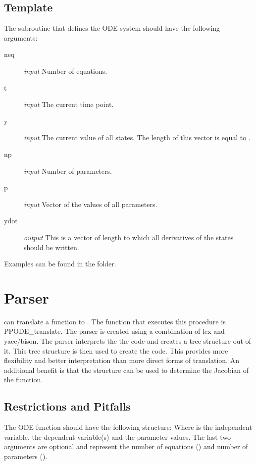 \subsection{Template}
The \Fortran subroutine that defines the ODE system should have the following arguments:
\begin{description}
 \item[neq] \emph{input} Number of equations.
 \item[t] \emph{input} The current time point.
 \item[y] \emph{input} The current value of all states. The length of this vector is equal to .
 \item[np] \emph{input} Number of parameters.
 \item[p] \emph{input} Vector of the values of all parameters.
 \item[ydot] \emph{output} This is a vector of length  to which all derivatives of the states should be written.
\end{description}



Examples can be found in the  folder.

\section{Parser} \label{sec:Parser}
\PPODESUITE can translate a \MATLAB function to \Fortran. The function that executes this procedure is PPODE\_translate. The parser is created using a combination of lex and yacc/bison. The parser interprets the the \MATLAB code and creates a tree structure out of it. This tree structure is then used to create the \Fortran code. This provides more flexibility and better interpretation than more direct forms of translation. An additional benefit is that the structure can be used to determine the Jacobian of the function.

\subsection{Restrictions and Pitfalls}
The \MATLAB ODE function should have the following structure:
Where  is the independent variable,  the dependent variable(s) and  the parameter values. The last two arguments are optional and represent the number of equations () and number of parameters ().

